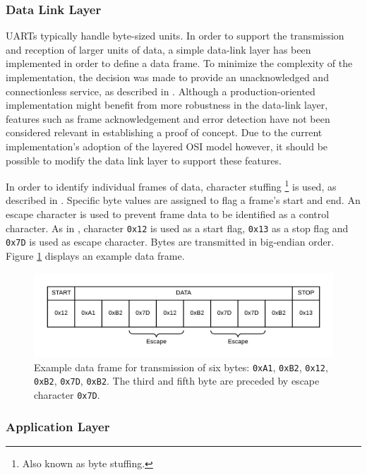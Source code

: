 \documentclass[main.tex]{subfiles}
\begin{document}
\subsubsection{Data Link Layer}

UARTs typically handle byte-sized units. In order to support the transmission and reception of larger units of data, a simple data-link layer has been implemented in order to define a data frame. To minimize the complexity of the implementation, the decision was made to provide an unacknowledged and  connectionless service, as described in \cite[p.177]{tanenbaumcomputer}. Although a production-oriented implementation might benefit from more robustness in the data-link layer, features such as frame acknowledgement and error detection have not been considered relevant in establishing a proof of concept. Due to the current implementation's adoption of the layered OSI model however, it should be possible to modify the data link layer to support these features. 

In order to identify individual frames of data, character stuffing \footnote{Also known as byte stuffing.} is used, as described in \cite[p.180]{tanenbaumcomputer}. Specific byte values are assigned to flag a frame's start and end. An escape character is used to prevent frame data to be identified as a control character. As in \cite{Frami37}, character \texttt{0x12} is used as a start flag, \texttt{0x13} as a stop flag and \texttt{0x7D} is used as escape character. Bytes are transmitted in big-endian order. Figure \ref{fig:character-stuffing} displays an example data frame.

\begin{figure}[h]
\centering
\caption{Example data frame for transmission of six bytes: \texttt{0xA1}, \texttt{0xB2}, \texttt{0x12}, \texttt{0xB2}, \texttt{0x7D}, \texttt{0xB2}. The third and fifth byte are preceded by escape character \texttt{0x7D}.}
\label{fig:character-stuffing}
\includegraphics[width=.8\textwidth]{img/character-stuffing}
\end{figure}

\subsubsection{Application Layer}
\end{document}

